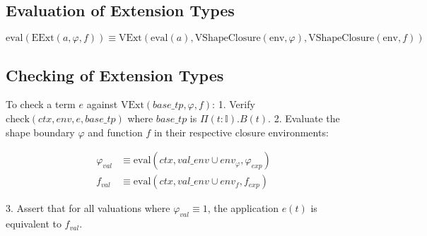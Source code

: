 \documentclass[11pt]{article}
\begin{document}
\subsection{Evaluation of Extension Types}
\begin{equation}
    \text{eval}(\text{EExt}(a, \varphi, f)) \equiv \text{VExt}(\text{eval}(a), \text{VShapeClosure}(\text{env}, \varphi), \text{VShapeClosure}(\text{env}, f))
\end{equation}

\subsection{Checking of Extension Types}
To check a term $e$ against $\text{VExt}(base\_tp, \varphi, f)$:
1. Verify $\text{check}(ctx, env, e, base\_tp)$ where $base\_tp$ is $\Pi(t : \mathbb{I}). B(t)$.
2. Evaluate the shape boundary $\varphi$ and function $f$ in their respective closure environments:

   \begin{align}
       \varphi_{val} &\equiv \text{eval}(ctx, val\_env \cup env_\varphi, \varphi_{exp}) \\
       f_{val} &\equiv \text{eval}(ctx, val\_env \cup env_f, f_{exp})
   \end{align}

3. Assert that for all valuations where $\varphi_{val} \equiv 1$, the application $e(t)$ is equivalent to $f_{val}$.
\end{document}
